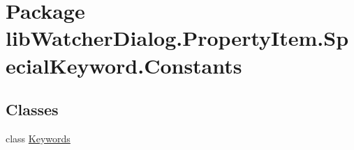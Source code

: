 \hypertarget{namespacelib_watcher_dialog_1_1_property_item_1_1_special_keyword_1_1_constants}{\section{Package lib\+Watcher\+Dialog.\+Property\+Item.\+Special\+Keyword.\+Constants}
\label{namespacelib_watcher_dialog_1_1_property_item_1_1_special_keyword_1_1_constants}
}
\subsection*{Classes}
\begin{DoxyCompactItemize}
\item 
class \hyperlink{classlib_watcher_dialog_1_1_property_item_1_1_special_keyword_1_1_constants_1_1_keywords}{Keywords}
\end{DoxyCompactItemize}
